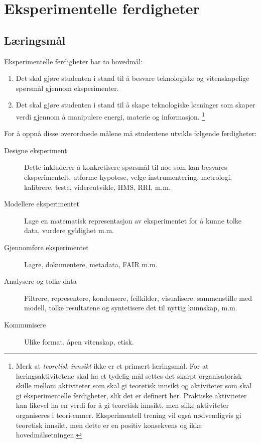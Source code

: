 \section{Eksperimentelle ferdigheter}

\subsection{Læringsmål}

Eksperimentelle ferdigheter har to hovedmål:
\begin{enumerate}
	\item Det skal gjøre studenten i stand til å besvare teknologiske og vitenskapelige spørsmål gjennom eksperimenter. 
	\item  Det skal gjøre studenten i stand til å skape teknologiske løsninger som skaper verdi gjennom å manipulere energi, materie og informasjon. \footnote{Merk at \emph{teoretisk innsikt} ikke er et primært læringsmål. For at læringsaktivitetene skal ha et tydelig mål settes det skarpt organisatorisk skille mellom aktiviteter som skal gi teoretisk innsikt og aktiviteter som skal gi eksperimentelle ferdigheter, slik det er definert her. Praktiske aktiviteter kan likevel ha en verdi for å gi teoretisk innsikt, men slike aktiviteter organiseres i teori-emner. Eksperimentell trening vil også nødvendigvis gi teoretisk innsikt, men dette er en positiv konsekvens og ikke hovedmålsetningen.}
\end{enumerate}

For å oppnå disse overordnede målene må studentene utvikle følgende ferdigheter:

\begin{description}
	\item [Designe eksperiment] Dette inkluderer å konkretisere spørsmål til noe som kan besvares eksperimentelt, utforme hypotese, velge instrumentering, metrologi, kalibrere, teste, videreutvikle, HMS, RRI, m.m.
	\item [Modellere eksperimentet] Lage en matematisk representasjon av eksperimentet for å kunne tolke data, vurdere gyldighet m.m.
	\item [Gjennomføre eksperimentet] Lagre, dokumentere, metadata, FAIR m.m.
	\item [Analysere og tolke data] Filtrere, representere, kondensere, feilkilder, visualisere, sammenstille med modell, tolke resultatene og syntetisere det til nyttig kunnskap, m.m.
	\item [Kommunisere] Ulike format, åpen vitenskap, etisk.
\end{description}


